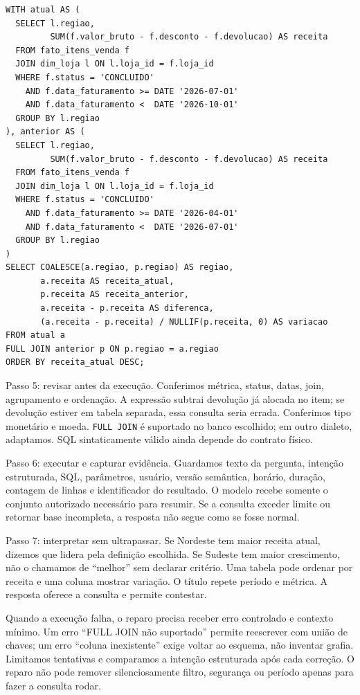 \begin{verbatim}
WITH atual AS (
  SELECT l.regiao,
         SUM(f.valor_bruto - f.desconto - f.devolucao) AS receita
  FROM fato_itens_venda f
  JOIN dim_loja l ON l.loja_id = f.loja_id
  WHERE f.status = 'CONCLUIDO'
    AND f.data_faturamento >= DATE '2026-07-01'
    AND f.data_faturamento <  DATE '2026-10-01'
  GROUP BY l.regiao
), anterior AS (
  SELECT l.regiao,
         SUM(f.valor_bruto - f.desconto - f.devolucao) AS receita
  FROM fato_itens_venda f
  JOIN dim_loja l ON l.loja_id = f.loja_id
  WHERE f.status = 'CONCLUIDO'
    AND f.data_faturamento >= DATE '2026-04-01'
    AND f.data_faturamento <  DATE '2026-07-01'
  GROUP BY l.regiao
)
SELECT COALESCE(a.regiao, p.regiao) AS regiao,
       a.receita AS receita_atual,
       p.receita AS receita_anterior,
       a.receita - p.receita AS diferenca,
       (a.receita - p.receita) / NULLIF(p.receita, 0) AS variacao
FROM atual a
FULL JOIN anterior p ON p.regiao = a.regiao
ORDER BY receita_atual DESC;
\end{verbatim}

Passo 5: revisar antes da execução. Conferimos métrica, status, datas, join, agrupamento e ordenação. A expressão subtrai devolução já alocada no item; se devolução estiver em tabela separada, essa consulta seria errada. Conferimos tipo monetário e moeda. \texttt{FULL JOIN} é suportado no banco escolhido; em outro dialeto, adaptamos. SQL sintaticamente válido ainda depende do contrato físico.

Passo 6: executar e capturar evidência. Guardamos texto da pergunta, intenção estruturada, SQL, parâmetros, usuário, versão semântica, horário, duração, contagem de linhas e identificador do resultado. O modelo recebe somente o conjunto autorizado necessário para resumir. Se a consulta exceder limite ou retornar base incompleta, a resposta não segue como se fosse normal.

Passo 7: interpretar sem ultrapassar. Se Nordeste tem maior receita atual, dizemos que lidera pela definição escolhida. Se Sudeste tem maior crescimento, não o chamamos de ``melhor'' sem declarar critério. Uma tabela pode ordenar por receita e uma coluna mostrar variação. O título repete período e métrica. A resposta oferece a consulta e permite contestar.

Quando a execução falha, o reparo precisa receber erro controlado e contexto mínimo. Um erro ``FULL JOIN não suportado'' permite reescrever com união de chaves; um erro ``coluna inexistente'' exige voltar ao esquema, não inventar grafia. Limitamos tentativas e comparamos a intenção estruturada após cada correção. O reparo não pode remover silenciosamente filtro, segurança ou período apenas para fazer a consulta rodar.

